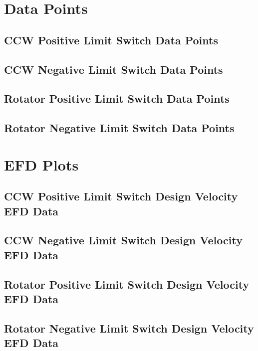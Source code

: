 \documentclass[SE,lsstdraft,authoryear,toc]{lsstdoc}
\begin{document}
\section{Data Points} \label{sec:data}
\subsection{CCW Positive Limit Switch Data Points}
\subsection{CCW Negative Limit Switch Data Points}
\subsection{Rotator Positive Limit Switch Data Points}
\subsection{Rotator Negative Limit Switch Data Points}
\section{EFD Plots} \label{sec:efd}
\subsection{CCW Positive Limit Switch Design Velocity EFD Data}
\subsection{CCW Negative Limit Switch Design Velocity EFD Data}
\subsection{Rotator Positive Limit Switch Design Velocity EFD Data}
\subsection{Rotator Negative Limit Switch Design Velocity EFD Data}
\end{document}
